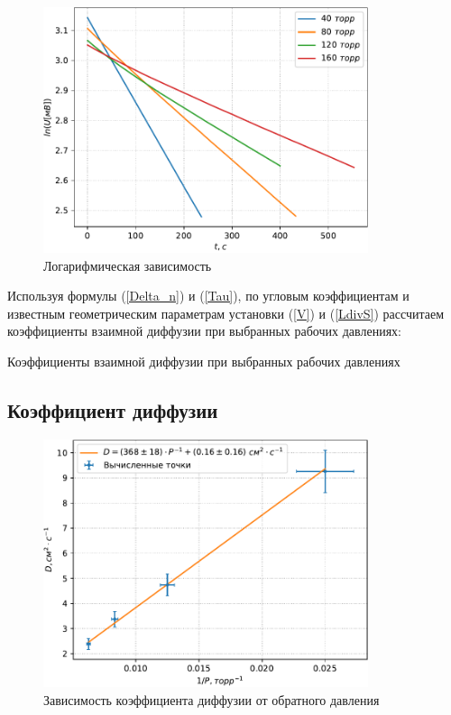\documentclass[a4paper,12pt]{article} %
\begin{document}
\begin{figure}[h!]
    \centering
    \includegraphics[width=0.85\textwidth]{lnU(t).pdf}
    \caption{Логарифмическая зависимость}\label{lnUt}
\end{figure}

Используя формулы (\ref{Delta_n}) и (\ref{Tau}), по угловым коэффициентам и известным геометрическим параметрам установки (\ref{V}) и (\ref{LdivS}) рассчитаем коэффициенты взаимной диффузии при выбранных рабочих давлениях:

\begin{table}[h!]
    \centering
    
    \caption{Коэффициенты взаимной диффузии при выбранных рабочих давлениях}
\end{table}

\FloatBarrier

\subsection*{Коэффициент диффузии}

\begin{figure}[h!]
    \centering
    \includegraphics[width=0.85\textwidth]{D(1divP).pdf}
    \caption{Зависимость коэффициента диффузии от обратного давления}
\end{figure}
\end{document}
